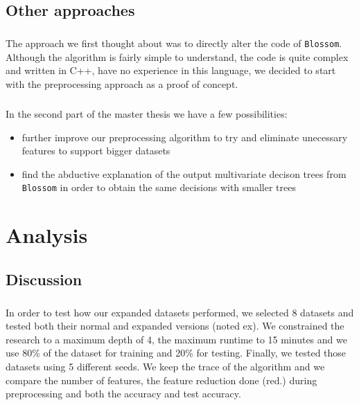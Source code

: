 \documentclass[12pt]{report}
\theoremstyle{definition}
\theoremstyle{definition}
\theoremstyle{definition}
\begin{document}
\section{Other approaches}
\paragraph{} The approach we first thought about was to directly alter the code of \texttt{Blossom}. Although the
algorithm is fairly simple to understand, the code is quite complex and written in C++, have no experience in
this language, we decided to start with the preprocessing approach as a proof of concept.

\paragraph{} In the second part of the master thesis we have a few possibilities:

\begin{itemize}
    \item further improve our preprocessing algorithm to try and eliminate unecessary features to support bigger
    datasets
    \item find the abductive explanation \cite{multivariate-explaining} of the output multivariate decison trees
    from \texttt{Blossom} in order to obtain the same decisions with smaller trees
\end{itemize}



\chapter{Analysis}
\section{Discussion}
\paragraph{} In order to test how our expanded datasets performed, we selected 8 datasets and tested both their normal
and expanded versions (noted ex). We constrained the research to a maximum depth of 4, the maximum runtime to 15 minutes
and we use 80\% of the dataset for training and 20\% for testing. Finally, we tested those datasets using 5 different
seeds. We keep the trace of the algorithm and we compare the number of features, the feature reduction done (red.) during
preprocessing and both the accuracy and test accuracy.
\end{document}
